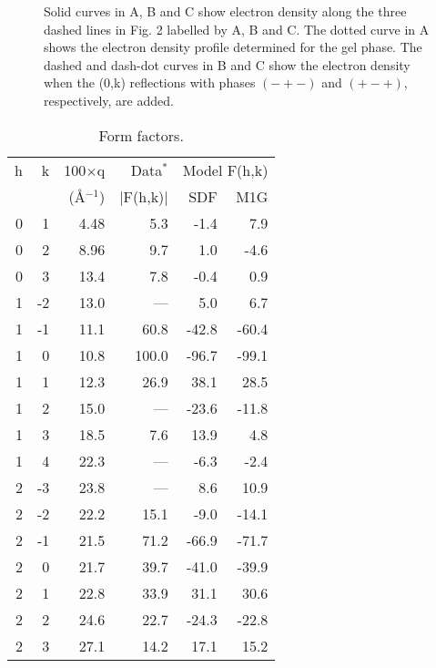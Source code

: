 \begin{figure}
\caption{Solid curves in A, B and C show electron density along the three 
dashed lines in Fig. 2 labelled by A, B and C.  The dotted curve in
A shows the electron density profile determined for the gel phase.
The dashed and dash-dot curves in B and C show the electron density when
the (0,k) reflections with phases $(-+-)$ and $(+-+)$, respectively, are
added.
\label{Fig3}}
\end{figure}

\pagebreak
\begin{table}
\caption{Form factors.
\label{formfactor}}
\vspace{6pt}
{\small
\begin{tabular}{rrrrrr} 
h & k & 100$\times$q & Data$^{*}$ &
        \multicolumn{2}{c}{Model F(h,k)} \\ \cline{5-6}
& & (\AA$^{-1}$) & $|$F(h,k)$|$ & SDF & M1G \\ \hline
0 &  1 & 4.48  &  5.3  &  -1.4  &  7.9  \\
0 &  2 & 8.96  & 9.7  &  1.0  &  -4.6 \\
0 &  3 & 13.4  &  7.8  &  -0.4   &  0.9 \\
1 &  -2 & 13.0  &  ---  &  5.0  &  6.7   \\
1 &  -1 & 11.1  &  60.8  &  -42.8  &  -60.4 \\
1 &   0 & 10.8  &  100.0  &  -96.7  &  -99.1 \\
1 &   1 & 12.3  &  26.9  &  38.1  &  28.5 \\
1 &   2 & 15.0  &  ---  &  -23.6  &  -11.8 \\
1 &   3 & 18.5  &  7.6  &  13.9  &  4.8 \\
1 &   4 & 22.3  &  ---  &  -6.3  &  -2.4 \\
2 &  -3 & 23.8  &  ---  &  8.6  &  10.9 \\
2 &  -2 & 22.2  &  15.1  &  -9.0  &  -14.1 \\
2 &  -1 & 21.5  &  71.2  &  -66.9  &  -71.7 \\
2 &   0 & 21.7  &  39.7  &  -41.0  &  -39.9 \\
2 &   1 & 22.8  &  33.9  &  31.1  &  30.6 \\
2 &   2 & 24.6  &  22.7  &  -24.3  &  -22.8 \\
2 &   3 & 27.1  &  14.2  &  17.1  &  15.2 \\

\end{tabular}}
\end{table}
